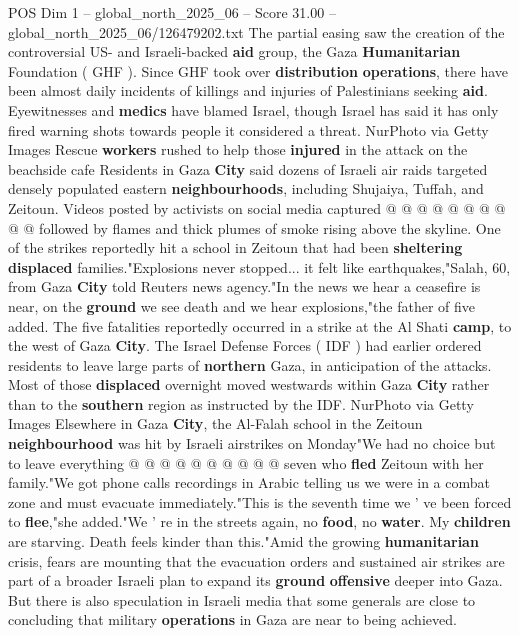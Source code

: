 \begin{textsample}{POS Dim 1 – global\_north\_2025\_06 – Score 31.00 – global\_north\_2025\_06/126479202.txt}
The partial easing saw the creation of the controversial US- and Israeli-backed \textbf{aid} group, the Gaza \textbf{Humanitarian} Foundation ( GHF ).
Since GHF took over \textbf{distribution} \textbf{operations}, there have been almost daily incidents of killings and injuries of Palestinians seeking \textbf{aid}.
Eyewitnesses and \textbf{medics} have blamed Israel, though Israel has said it has only fired warning shots towards people it considered a threat.
NurPhoto via Getty Images Rescue \textbf{workers} rushed to help those \textbf{injured} in the attack on the beachside cafe Residents in Gaza \textbf{City} said dozens of Israeli air raids targeted densely populated eastern \textbf{neighbourhoods}, including Shujaiya, Tuffah, and Zeitoun.
Videos posted by activists on social media captured @ @ @ @ @ @ @ @ @ @ followed by flames and thick plumes of smoke rising above the skyline.
One of the strikes reportedly hit a school in Zeitoun that had been \textbf{sheltering} \textbf{displaced} families."Explosions never stopped... it felt like earthquakes,"Salah, 60, from Gaza \textbf{City} told Reuters news agency."In the news we hear a ceasefire is near, on the \textbf{ground} we see death and we hear explosions,"the father of five added.
The five fatalities reportedly occurred in a strike at the Al Shati \textbf{camp}, to the west of Gaza \textbf{City}.
The Israel Defense Forces ( IDF ) had earlier ordered residents to leave large parts of \textbf{northern} Gaza, in anticipation of the attacks.
Most of those \textbf{displaced} overnight moved westwards within Gaza \textbf{City} rather than to the \textbf{southern} region as instructed by the IDF.
NurPhoto via Getty Images Elsewhere in Gaza \textbf{City}, the Al-Falah school in the Zeitoun \textbf{neighbourhood} was hit by Israeli airstrikes on Monday"We had no choice but to leave everything @ @ @ @ @ @ @ @ @ @ seven who \textbf{fled} Zeitoun with her family."We got phone calls recordings in Arabic telling us we were in a combat zone and must evacuate immediately."This is the seventh time we ' ve been forced to \textbf{flee},"she added."We ' re in the streets again, no \textbf{food}, no \textbf{water}.
My \textbf{children} are starving.
Death feels kinder than this."Amid the growing \textbf{humanitarian} crisis, fears are mounting that the evacuation orders and sustained air strikes are part of a broader Israeli plan to expand its \textbf{ground} \textbf{offensive} deeper into Gaza.
But there is also speculation in Israeli media that some generals are close to concluding that military \textbf{operations} in Gaza are near to being achieved.

\end{textsample}
